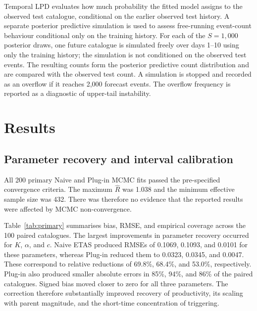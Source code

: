 \documentclass{statsmsc}
\begin{document}
Temporal LPD evaluates how much probability the fitted model assigns to the
observed test catalogue, conditional on the earlier observed test history. A separate posterior predictive simulation is used to assess free-running
event-count behaviour conditional only on the training history. For each of the \(S=1,000\) posterior draws, one future
catalogue is simulated freely over days 1--10 using only the training history;
the simulation is not conditioned on the observed test events. The resulting
counts form the posterior predictive count distribution and are compared with
the observed test count. A simulation is stopped and recorded as an overflow
if it reaches 2,000 forecast events. The overflow frequency is reported as a
diagnostic of upper-tail instability.

\section{Results}\label{sec:results}

\subsection{Parameter recovery and interval calibration}
\label{sec:primary_results}

All 200 primary Naive and Plug-in MCMC fits passed the pre-specified
convergence criteria. The maximum \(\widehat R\) was 1.038 and the minimum
effective sample size was 432. There was therefore no evidence that the
reported results were affected by MCMC non-convergence.

Table~\ref{tab:primary} summarises bias, RMSE, and empirical coverage across the 100 paired catalogues. The largest improvements in parameter recovery occurred for \(K\), \(\alpha\), and \(c\). Naive ETAS produced RMSEs of 0.1069, 0.1093, and 0.0101 for these parameters, whereas Plug-in reduced them to 0.0323, 0.0345, and 0.0047. These correspond to relative reductions of 69.8\%, 68.4\%, and 53.0\%, respectively. Plug-in also produced smaller absolute errors in 85\%, 94\%, and 86\% of the paired catalogues. Signed bias moved closer to zero for all three parameters. The correction therefore substantially improved recovery of productivity, its scaling with parent magnitude, and the short-time concentration of triggering.
\end{document}
